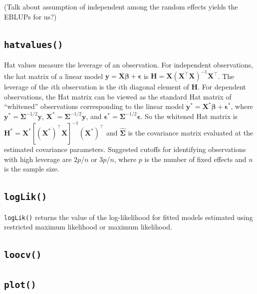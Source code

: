 \documentclass{article}
\begin{document}
(Talk about assumption of independent among the random effects yields
the EBLUPs for us?)

\hypertarget{hatvalues}{%
\subsection{\texorpdfstring{\texttt{hatvalues()}}{hatvalues()}}\label{hatvalues}}

Hat values measure the leverage of an observation. For independent
observations, the hat matrix of a linear model
\(\mathbf{y} = \mathbf{X} \boldsymbol{\beta} + \boldsymbol{\epsilon}\)
is
\(\mathbf{H} = \mathbf{X} (\mathbf{X}^\intercal \mathbf{X})^{-1} \mathbf{X}^\intercal\).
The leverage of the \(i\)th observation is the \(i\)th diagonal element
of \(\mathbf{H}\). For dependent observations, the Hat matrix can be
viewed as the standard Hat matrix of ``whitened'' observations
corresponding to the linear model
\(\mathbf{y}^* = \mathbf{X}^* \boldsymbol{\beta} + \boldsymbol{\epsilon}^*\),
where \(\mathbf{y}^* = \boldsymbol{\Sigma}^{-1/2} \mathbf{y}\),
\(\mathbf{X}^* = \boldsymbol{\Sigma}^{-1/2} \mathbf{y}\), and
\(\boldsymbol{\epsilon}^* = \boldsymbol{\Sigma}^{-1/2} \boldsymbol{\epsilon}\).
So the whitened Hat matrix is
\(\mathbf{H}^* = \mathbf{X}^* [(\mathbf{X}^*)^\intercal \mathbf{X}]^{-1} (\mathbf{X}^*)^\intercal\)
and \(\hat{\boldsymbol{\Sigma}}\) is the covariance matrix evaluated at
the estimated covariance parameters. Suggested cutoffs for identifying
observations with high leverage are \(2p / n\) or \(3p / n\), where
\(p\) is the number of fixed effects and \(n\) is the sample size.

\hypertarget{loglik}{%
\subsection{\texorpdfstring{\texttt{logLik()}}{logLik()}}\label{loglik}}

\texttt{logLik()} returns the value of the log-likelihood for fitted
models estimated using restricted maximum likelihood or maximum
likelihood.

\hypertarget{loocv}{%
\subsection{\texorpdfstring{\texttt{loocv()}}{loocv()}}\label{loocv}}

\hypertarget{plot}{%
\subsection{\texorpdfstring{\texttt{plot()}}{plot()}}\label{plot}}
\end{document}
